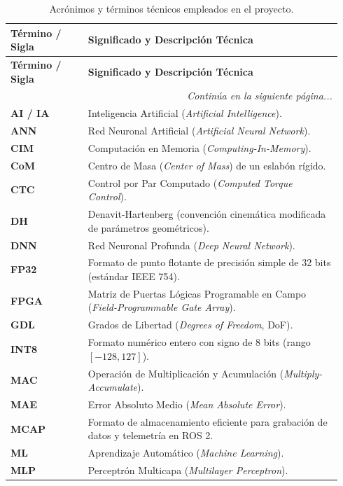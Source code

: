 \documentclass[12pt]{article}
\begin{document}
\vspace{0.5cm}
\begin{longtable}{p{0.22\linewidth} p{0.72\linewidth}}
\caption{Acrónimos y términos técnicos empleados en el proyecto.} \label{tab:nomenclatura} \\
\toprule
\textbf{Término / Sigla} & \textbf{Significado y Descripción Técnica} \\
\midrule
\endfirsthead
\toprule
\textbf{Término / Sigla} & \textbf{Significado y Descripción Técnica} \\
\midrule
\endhead
\midrule
\multicolumn{2}{r}{\textit{Continúa en la siguiente página...}} \\
\bottomrule
\endfoot
\bottomrule
\endlastfoot
\textbf{AI / IA} & Inteligencia Artificial (\textit{Artificial Intelligence}). \\
\textbf{ANN} & Red Neuronal Artificial (\textit{Artificial Neural Network}). \\
\textbf{CIM} & Computación en Memoria (\textit{Computing-In-Memory}). \\
\textbf{CoM} & Centro de Masa (\textit{Center of Mass}) de un eslabón rígido. \\
\textbf{CTC} & Control por Par Computado (\textit{Computed Torque Control}). \\
\textbf{DH} & Denavit-Hartenberg (convención cinemática modificada de parámetros geométricos). \\
\textbf{DNN} & Red Neuronal Profunda (\textit{Deep Neural Network}). \\
\textbf{FP32} & Formato de punto flotante de precisión simple de 32 bits (estándar IEEE 754). \\
\textbf{FPGA} & Matriz de Puertas Lógicas Programable en Campo (\textit{Field-Programmable Gate Array}). \\
\textbf{GDL} & Grados de Libertad (\textit{Degrees of Freedom}, DoF). \\
\textbf{INT8} & Formato numérico entero con signo de 8 bits (rango $[-128, 127]$). \\
\textbf{MAC} & Operación de Multiplicación y Acumulación (\textit{Multiply-Accumulate}). \\
\textbf{MAE} & Error Absoluto Medio (\textit{Mean Absolute Error}). \\
\textbf{MCAP} & Formato de almacenamiento eficiente para grabación de datos y telemetría en ROS 2. \\
\textbf{ML} & Aprendizaje Automático (\textit{Machine Learning}). \\
\textbf{MLP} & Perceptrón Multicapa (\textit{Multilayer Perceptron}). \\

\end{longtable}
\end{document}
